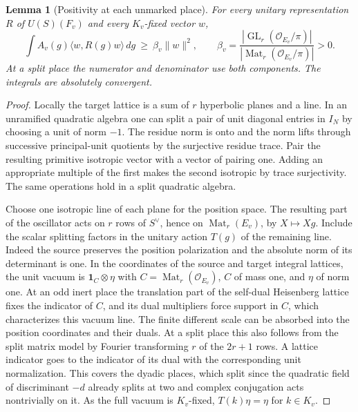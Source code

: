 \documentclass[a4paper,11pt]{article}
\newtheorem{lemma}[proposition]{Lemma}
\theoremstyle{definition}
\theoremstyle{remark}
\numberwithin{equation}{section}
\begin{document}
\begin{lemma}[Positivity at each unmarked place]
\leavevmode\label{lem:thresholdpositive816}
For every unitary representation \(R\) of \(U(S)(F_v)\)
and every \(K_v\)-fixed vector \(w\),
\[
   \int A_v(g)\langle w,R(g)w\rangle\,dg
     \ \ge\ \beta_v\|w\|^2,\qquad
   \beta_v=\frac{|\operatorname{GL}_r(\mathcal O_{E_v}/\pi)|}
                  {|\operatorname{Mat}_r(\mathcal O_{E_v}/\pi)|}>0 .
\]
At a split place the numerator and denominator use both
components. The integrals are absolutely convergent.
\end{lemma}
\begin{proof}
Locally the target lattice is a sum of \(r\) hyperbolic
planes and a line. In an unramified quadratic algebra
one can split a pair of unit diagonal entries in \(I_N\)
by choosing a unit of norm \(-1\). The residue norm is
onto and the norm lifts through successive principal-unit
quotients by the surjective residue trace. Pair the
resulting primitive isotropic vector with a vector of
pairing one. Adding an appropriate multiple of the first
makes the second isotropic by trace surjectivity.
The same operations hold in a split quadratic algebra.

Choose one isotropic line of each plane for the position
space. The resulting part of the oscillator acts on
\(r\) rows of \(S^\vee\), hence on
\(\operatorname{Mat}_r(E_v)\), by \(X\mapsto Xg\).
Include the scalar splitting factors in the unitary
action \(T(g)\) of the remaining line. Indeed
the source preserves the position polarization and the
absolute norm of its determinant is one. In the
coordinates of the source and target integral lattices,
the unit vacuum is \(\mathbf 1_C\otimes\eta\) with
\(C=\operatorname{Mat}_r(\mathcal O_{E_v})\), \(C\) of
mass one, and \(\eta\) of norm one. At an odd inert
place the translation part of the self-dual Heisenberg
lattice fixes the indicator of \(C\), and its dual
multipliers force support in \(C\), which characterizes
this vacuum line. The finite different scale can be
absorbed into the position coordinates and their duals.
At a split place this also follows from the split
matrix model by Fourier transforming \(r\) of the
\(2r+1\) rows. A lattice indicator goes to the indicator
of its dual with the corresponding unit normalization.
This covers the dyadic places, which split since the
quadratic field of discriminant \(-d\) already splits
at two and complex conjugation acts nontrivially on it.
As the full vacuum is \(K_v\)-fixed,
\(T(k)\eta=\eta\) for \(k\in K_v\).


\end{proof}
\end{document}
